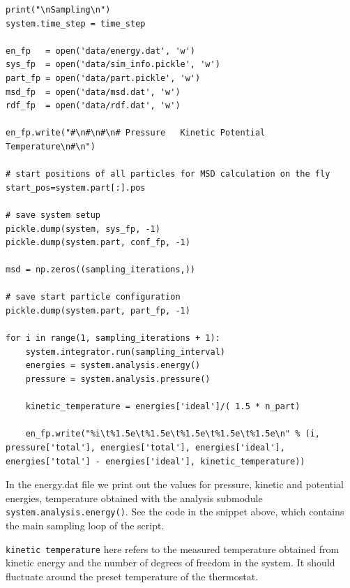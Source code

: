 \documentclass[
paper=a4,                       %
fontsize=11pt,                  %
twoside,                        %
footsepline,                    %
headsepline,                    %
headinclude=false,              %
footinclude=false,              %
pagesize,                       %
]{scrartcl}
\newtheorem{task}{Task}
\begin{document}
{\begin{lstlisting}
print("\nSampling\n")
system.time_step = time_step

en_fp   = open('data/energy.dat', 'w')
sys_fp  = open('data/sim_info.pickle', 'w')
part_fp = open('data/part.pickle', 'w')
msd_fp  = open('data/msd.dat', 'w')
rdf_fp  = open('data/rdf.dat', 'w')

en_fp.write("#\n#\n#\n# Pressure   Kinetic Potential   Temperature\n#\n")

# start positions of all particles for MSD calculation on the fly
start_pos=system.part[:].pos

# save system setup
pickle.dump(system, sys_fp, -1)
pickle.dump(system.part, conf_fp, -1)

msd = np.zeros((sampling_iterations,))

# save start particle configuration
pickle.dump(system.part, part_fp, -1)

for i in range(1, sampling_iterations + 1):
    system.integrator.run(sampling_interval)
    energies = system.analysis.energy()
    pressure = system.analysis.pressure()

    kinetic_temperature = energies['ideal']/( 1.5 * n_part)

    en_fp.write("%i\t%1.5e\t%1.5e\t%1.5e\t%1.5e\t%1.5e\n" % (i, pressure['total'], energies['total'], energies['ideal'], energies['total'] - energies['ideal'], kinetic_temperature))
\end{lstlisting}}\vspace{0,2cm}

In the energy.dat file we print out the values for pressure, kinetic
and potential energies, temperature obtained with the analysis submodule
\lstinline|system.analysis.energy()|. See the code in the snippet above, which
contains the main sampling loop of the script.

\noindent \texttt{kinetic temperature} here refers to the measured temperature
obtained from kinetic energy and the number of degrees of freedom in the system. It
should fluctuate around the preset temperature of the thermostat.

\newpage
\vspace{1cm}\vspace{1cm}
\end{document}
